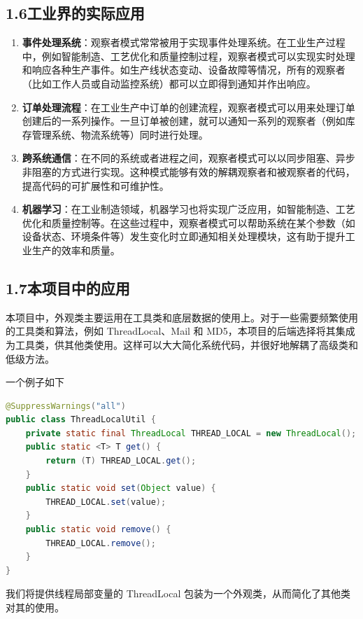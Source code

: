 \documentclass[24pt,a4paper]{article}%
\begin{document}
\subsection*{\songti 1.6工业界的实际应用}
\begin{enumerate}
    \item \textbf{事件处理系统}：观察者模式常常被用于实现事件处理系统。在工业生产过程中，例如智能制造、工艺优化和质量控制过程，观察者模式可以实现实时处理和响应各种生产事件。如生产线状态变动、设备故障等情况，所有的观察者（比如工作人员或自动监控系统）都可以立即得到通知并作出响应。
    \item \textbf{订单处理流程}：在工业生产中订单的创建流程，观察者模式可以用来处理订单创建后的一系列操作。一旦订单被创建，就可以通知一系列的观察者（例如库存管理系统、物流系统等）同时进行处理。
    \item \textbf{跨系统通信}：在不同的系统或者进程之间，观察者模式可以以同步阻塞、异步非阻塞的方式进行实现。这种模式能够有效的解耦观察者和被观察者的代码，提高代码的可扩展性和可维护性。
    \item \textbf{机器学习}：在工业制造领域，机器学习也将实现广泛应用，如智能制造、工艺优化和质量控制等。在这些过程中，观察者模式可以帮助系统在某个参数（如设备状态、环境条件等）发生变化时立即通知相关处理模块，这有助于提升工业生产的效率和质量。
\end{enumerate}

\subsection*{\songti 1.7本项目中的应用}
本项目中，外观类主要运用在工具类和底层数据的使用上。对于一些需要频繁使用的工具类和算法，例如 ThreadLocal、Mail 和 MD5，本项目的后端选择将其集成为工具类，供其他类使用。这样可以大大简化系统代码，并很好地解耦了高级类和低级方法。

一个例子如下
\begin{lstlisting}[language=Java]
@SuppressWarnings("all")
public class ThreadLocalUtil {
    private static final ThreadLocal THREAD_LOCAL = new ThreadLocal();
    public static <T> T get() {
        return (T) THREAD_LOCAL.get();
    }
    public static void set(Object value) {
        THREAD_LOCAL.set(value);
    }
    public static void remove() {
        THREAD_LOCAL.remove();
    }
}
\end{lstlisting}
我们将提供线程局部变量的 ThreadLocal 包装为一个外观类，从而简化了其他类对其的使用。
\end{document}
